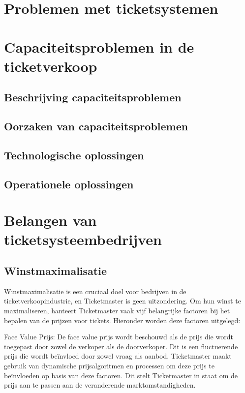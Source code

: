 \documentclass[a4paper, 12pt]{article}
\begin{document}
\tableofcontents
\newpage


\section{Problemen met ticketsystemen}
\newpage

\section{Capaciteitsproblemen in de ticketverkoop}
\subsection{Beschrijving capaciteitsproblemen}
\subsection{Oorzaken van capaciteitsproblemen}
\subsection{Technologische oplossingen}
\subsection{Operationele oplossingen}

\newpage
\section{Belangen van ticketsysteembedrijven}

\subsection{Winstmaximalisatie}
Winstmaximalisatie is een cruciaal doel voor bedrijven in de ticketverkoopindustrie, en Ticketmaster is geen uitzondering. Om hun winst te maximaliseren, hanteert Ticketmaster vaak vijf belangrijke factoren bij het bepalen van de prijzen voor tickets. Hieronder worden deze factoren uitgelegd:

\vspace{5 mm}

Face Value Prijs: De face value prijs wordt beschouwd als de prijs die wordt toegepast door zowel de verkoper als de doorverkoper. Dit is een fluctuerende prijs die wordt beïnvloed door zowel vraag als aanbod. Ticketmaster maakt gebruik van dynamische prijsalgoritmen en processen om deze prijs te beïnvloeden op basis van deze factoren. Dit stelt Ticketmaster in staat om de prijs aan te passen aan de veranderende marktomstandigheden.
\end{document}
